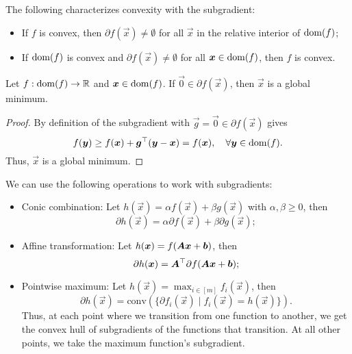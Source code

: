 \begin{lemma}
    The following characterizes convexity with the subgradient:
    \begin{itemize}
        \item If $f$ is convex, then $\partial f(\vec{x}) \neq \emptyset$ for all $\vec{x}$ in the relative
              interior of $\mathrm{dom}(f)$;
        \item If $\mathrm{dom}(f)$ is convex and $\partial f(\vec{x}) \neq \emptyset$ for all $\bm{x} \in \mathrm{dom}(f)$, then
              $f$ is convex.
    \end{itemize}
\end{lemma}

\begin{lemma}
    Let $f: \mathrm{dom}(f) \to \mathbb{R}$ and $\bm{x} \in \mathrm{dom}(f)$. If $\vec{0} \in \partial f(\vec{x})$, then $\vec{x}$ is a global minimum.
\end{lemma}

\begin{proof}
    By definition of the subgradient with $\vec{g} = \vec{0} \in \partial f(\vec{x})$ gives \[
        f(\bm{y}) \geq f(\bm{x}) + \bm{g}^\top (\bm{y} - \bm{x}) = f(\bm{x}), \quad \forall \bm{y} \in \mathrm{dom}(f).
    \]
    Thus, $\vec{x}$ is a global minimum.
\end{proof}

\begin{lemma}
    We can use the following operations to work with subgradients:
    \begin{itemize}
        \item Conic combination: Let $h(\vec{x}) = \alpha f(\vec{x}) + \beta g(\vec{x})$ with $\alpha,\beta \geq
                  0$, then \[
                  \partial h(\vec{x}) = \alpha \partial f(\vec{x}) + \beta \partial g(\vec{x});
              \]
        \item Affine transformation: Let $h(\bm{x}) = f(\bm{A} \bm{x} + \bm{b})$, then \[
                  \partial h(\bm{x}) = \bm{A}^\top \partial f(\bm{A} \bm{x} + \bm{b});
              \]
        \item Pointwise maximum: Let $h(\vec{x}) = \max_{i\in [m]} f_i(\vec{x})$, then \[
                  \partial h(\vec{x}) = \mathrm{conv}(\{ \partial f_i(\vec{x}) \mid f_i(\vec{x}) = h(\vec{x}) \}).
              \]
              Thus, at each point where we transition from one function to another, we get the convex hull of
              subgradients of the functions that transition. At all other points, we take the maximum function's
              subgradient.
    \end{itemize}
\end{lemma}


